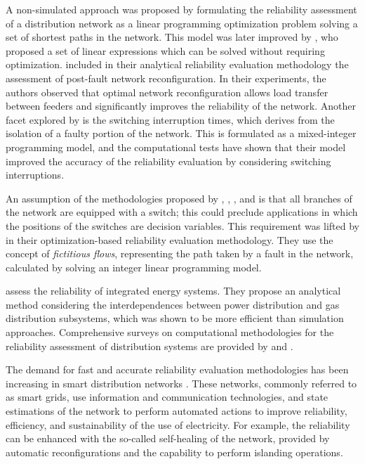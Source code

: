 A non-simulated approach was proposed by  \cite{DelgadoContrerasArroyo2018} formulating the reliability assessment of a distribution network as a linear programming optimization problem solving a set of shortest paths in the network. This model was 
 later improved by \cite{TabaresEtal2019}, who proposed a set of linear expressions which can be solved without requiring optimization. 
\cite{LiEtAl2020a} included in their analytical reliability evaluation methodology the assessment of post-fault network reconfiguration. In their experiments, the authors observed that optimal network reconfiguration allows load  transfer  between feeders and significantly improves the reliability of the network. Another facet explored by \cite{Contreras2020} is the switching interruption times, which derives from the isolation of a faulty portion of the network. This is formulated as a mixed-integer programming model, and the computational tests have shown that their model improved the accuracy of the reliability evaluation by considering switching interruptions.

An assumption of the methodologies proposed by \cite{DelgadoContrerasArroyo2018}, \cite{TabaresEtal2019}, \cite{LiEtAl2020a}, and \cite{Contreras2020}  is that all branches of the network are equipped with a switch; this could preclude applications in which the positions of the switches are decision variables.
This requirement was lifted by \cite{LiEtAl2020b} in their optimization-based reliability evaluation methodology. They use the concept of \textit{fictitious flows}, representing the path taken by a fault in the network, calculated by solving an integer linear programming model.


\cite{JuanweiTaoYueXiaohuaBoBaomin2019} assess the reliability of integrated energy systems. They propose an analytical method considering the interdependences between power distribution and gas distribution subsystems, which was shown to be more efficient than simulation approaches.
Comprehensive surveys on computational methodologies for the reliability assessment of distribution systems are provided by \cite{Borges2012} and \cite{Lin2014}.

The demand for fast and accurate reliability evaluation methodologies has been increasing in smart distribution networks \cite{GhianiEtal2018}. These networks, commonly referred to as smart grids, use information and communication technologies, and state estimations of the network to perform automated actions to improve reliability, efficiency, and sustainability of the use of electricity. For example, the reliability can be enhanced with the so-called self-healing of the network, provided by automatic reconfigurations and the capability to perform islanding operations.


